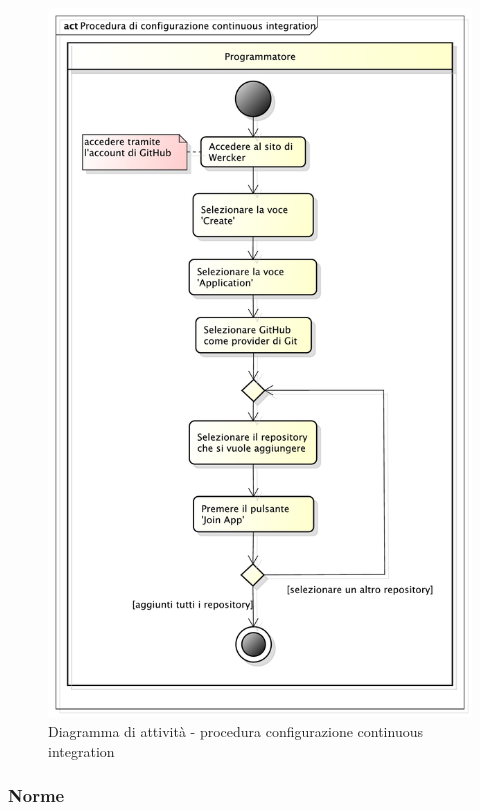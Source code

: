 				\begin{figure}[htbp]
					\centering
					\includegraphics[scale=0.5]{images/proc_aggiunta_wercker.pdf}
					\caption{Diagramma di attività - procedura configurazione continuous integration}
					\label{fig:procedura_assegnazione_anomalie}
				\end{figure}


		\subsubsection{Norme}
		\label{ssub:norme}

